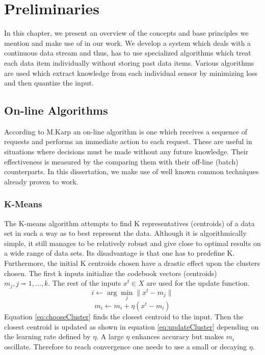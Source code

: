 \documentclass{mproj}
\begin{document}
\chapter{Preliminaries}
In this chapter, we present an overview of the concepts and base principles we mention and make use of in our work. We develop a system which deals with a continuous data stream and thus, has to use specialized algorithms which treat each data item individually without storing past data items. Various algorithms are used which extract knowledge from each individual sensor by minimizing loss and then quantize the input.

\section{On-line Algorithms}
According to M.Karp \cite{Karp} an on-line algorithm is one which receives a sequence of requests and performs an immediate action to each request. These are useful in situations where decisions must be made without any future knowledge. Their effectiveness is measured by the comparing them with their off-line (batch) counterparts. In this dissertation, we make use of well known common techniques already proven to work.

\subsection{K-Means}
The K-means algorithm attempts to find K representatives (centroids) of a data set in such a way as to best represent the data. \cite{onlinekmeans} Although it is algorithmically simple, it still manages to be relatively robust and give close to optimal results on a wide range of data sets. Its disadvantage is that one has to predefine K. Furthermore, the initial K centroids chosen have a drastic effect upon the clusters chosen. The first k inputs initialize the codebook vectors (centroids) $m_j,j=1,...,k$. The rest of the inputs $x^t \in X$ are used for the update function.
\begin{equation}
\label{eq:chooseCluster}
i \longleftarrow \arg\min _j \parallel x^t - m_j \parallel
\end{equation}
\begin{equation}
\label{eq:updateCluster}
m_i \longleftarrow m_i + \eta (x^t - m_i)
\end{equation}
Equation \ref{eq:chooseCluster} finds the closest centroid to the input. Then the closest centroid is updated as shown in equation \ref{eq:updateCluster} depending on the learning rate defined by $\eta$. A large $\eta$ enhances accuracy but makes $m_i$ oscillate. Therefore to reach convergence one needs to use a small or decaying $\eta$.
\end{document}
